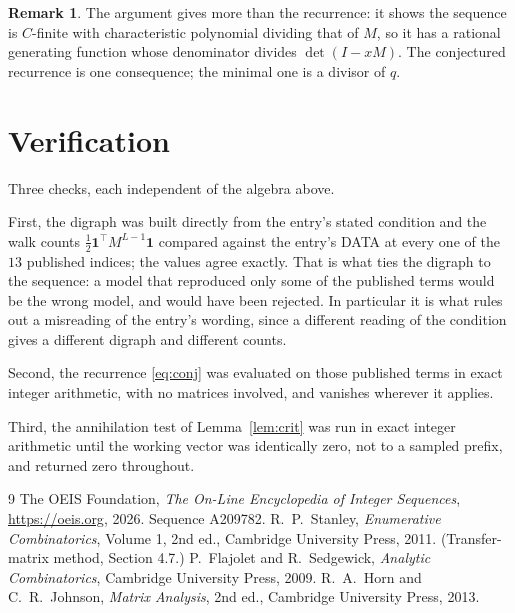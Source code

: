 \documentclass[11pt,a4paper]{article}
\theoremstyle{plain}
\theoremstyle{definition}
\newtheorem{remark}[theorem]{Remark}
\begin{document}
\begin{remark}
The argument gives more than the recurrence: it shows the sequence is $C$-finite with
characteristic polynomial dividing that of $M$, so it has a rational generating function
whose denominator divides $\det(I-xM)$. The conjectured recurrence is one consequence; the
minimal one is a divisor of $q$.
\end{remark}

\section{Verification}

Three checks, each independent of the algebra above.

First, the digraph was built directly from the entry's stated condition and the walk counts
$\tfrac1{2}\mathbf{1}^{\!\top}M^{L-1}\mathbf{1}$ compared against the entry's DATA at
every one of the $13$ published indices; the values agree exactly. That is what ties
the digraph to the sequence: a model that reproduced only some of the published terms would
be the wrong model, and would have been rejected. In particular it is what rules out a
misreading of the entry's wording, since a different reading of the condition gives a
different digraph and different counts.

Second, the recurrence \eqref{eq:conj} was evaluated on those published terms in exact
integer arithmetic, with no matrices involved, and vanishes wherever it applies.

Third, the annihilation test of Lemma~\ref{lem:crit} was run in exact integer arithmetic
until the working vector was identically zero, not to a sampled prefix, and returned zero
throughout.

\begin{thebibliography}{9}
 The OEIS Foundation, \emph{The On-Line Encyclopedia of Integer
Sequences}, \url{https://oeis.org}, 2026. Sequence A209782.
 R.~P.~Stanley, \emph{Enumerative Combinatorics}, Volume 1, 2nd ed.,
Cambridge University Press, 2011. (Transfer-matrix method, Section 4.7.)
 P.~Flajolet and R.~Sedgewick, \emph{Analytic Combinatorics}, Cambridge
University Press, 2009.
 R.~A.~Horn and C.~R.~Johnson, \emph{Matrix Analysis}, 2nd ed., Cambridge
University Press, 2013.
\end{thebibliography}
\end{document}
